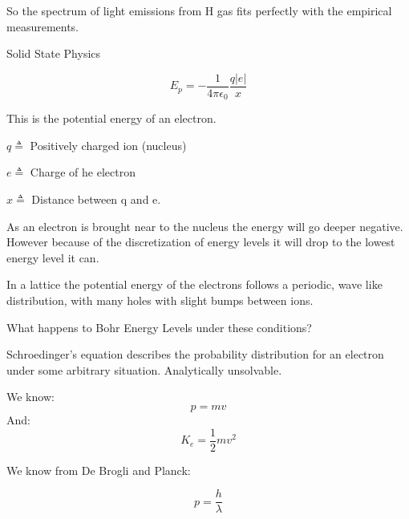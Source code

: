 \documentclass{report}
\begin{document}
\begin{description}
\begin{mdframed}
           So the spectrum of light emissions from H gas
           fits perfectly with the empirical measurements.
           
        \end{mdframed}

    \item {\large Solid State Physics}
        \begin{mdframed}
           \begin{displaymath}
               E_p = -\frac{1}{4 \pi \epsilon_0} \frac{q |e|}{x}
           \end{displaymath}
            
            This is the potential energy of an electron.

            $q \triangleq$ Positively charged ion (nucleus)

            $e \triangleq$ Charge of he electron

            $x \triangleq$ Distance between q and e.
        \end{mdframed}
        \begin{mdframed}
            As an electron is brought near to the nucleus
            the energy will go deeper negative. However
            because of the discretization of energy
            levels it will drop to the lowest energy level it
            can.

            In a lattice the potential energy of the electrons
            follows a periodic, wave like distribution, with
            many holes with slight bumps between ions.


            What happens to Bohr Energy Levels under these
            conditions?

            Schroedinger's equation describes the probability distribution
            for an electron under some arbitrary situation. Analytically
            unsolvable.

            We know:
            \begin{displaymath}
                p = mv
            \end{displaymath}
            And: 
            \begin{displaymath}
                K_e = \frac{1}{2}mv^2
            \end{displaymath}

            We know from De Brogli and Planck:

            \begin{displaymath}
                p = \frac{h}{\lambda}                
            \end{displaymath}
            

\end{mdframed}
\end{description}
\end{document}
